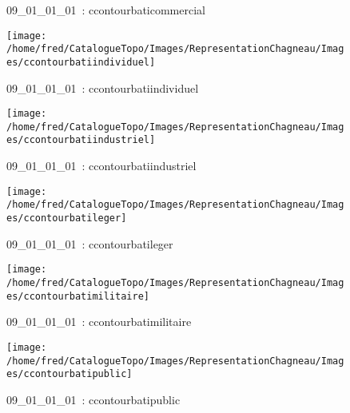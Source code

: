 \documentclass[12pt,titlepage]{book}
\begin{document}
\begin{figure}[h!]
\begin{minipage}[t]{3cm}
\begin{center}
      \caption[~09\_01\_01\_01]{\small{09\_01\_01\_01~:} \tiny{ccontourbaticommercial}}\label{ccontourbaticommercial}
    \end{center}
  \end{minipage}
  \begin{minipage}[t]{3cm}
    \begin{center}
      \texttt{[image: /home/fred/CatalogueTopo/Images/RepresentationChagneau/Images/ccontourbatiindividuel]}
      \caption[~09\_01\_01\_01]{\small{09\_01\_01\_01~:} \tiny{ccontourbatiindividuel}}\label{ccontourbatiindividuel}
    \end{center}
  \end{minipage}
  \begin{minipage}[t]{3cm}
    \begin{center}
      \texttt{[image: /home/fred/CatalogueTopo/Images/RepresentationChagneau/Images/ccontourbatiindustriel]}
      \caption[~09\_01\_01\_01]{\small{09\_01\_01\_01~:} \tiny{ccontourbatiindustriel}}\label{ccontourbatiindustriel}
    \end{center}
  \end{minipage}
  \begin{minipage}[t]{3cm}
    \begin{center}
      \texttt{[image: /home/fred/CatalogueTopo/Images/RepresentationChagneau/Images/ccontourbatileger]}
      \caption[~09\_01\_01\_01]{\small{09\_01\_01\_01~:} \tiny{ccontourbatileger}}\label{ccontourbatileger}
    \end{center}
  \end{minipage}
  \begin{minipage}[t]{3cm}
    \begin{center}
      \texttt{[image: /home/fred/CatalogueTopo/Images/RepresentationChagneau/Images/ccontourbatimilitaire]}
      \caption[~09\_01\_01\_01]{\small{09\_01\_01\_01~:} \tiny{ccontourbatimilitaire}}\label{ccontourbatimilitaire}
    \end{center}
  \end{minipage}
  \begin{minipage}[t]{3cm}
    \begin{center}
      \texttt{[image: /home/fred/CatalogueTopo/Images/RepresentationChagneau/Images/ccontourbatipublic]}
      \caption[~09\_01\_01\_01]{\small{09\_01\_01\_01~:} \tiny{ccontourbatipublic}}\label{ccontourbatipublic}

\end{center}
\end{minipage}
\end{figure}
\end{document}
